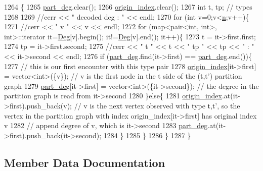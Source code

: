 \begin{DoxyCode}
1264 \{
1265   \hyperlink{classmarked__graph__decoder_a6882e96fcad9abb10e72f1398814824a}{part\_deg}.clear();
1266   \hyperlink{classmarked__graph__decoder_aab3e2f6d4376ba96da32f25aa9ddd069}{origin\_index}.clear();
1267   \textcolor{keywordtype}{int} t, tp; \textcolor{comment}{// types}
1268 
1269   \textcolor{comment}{//cerr << " decoded deg : " << endl;}
1270   \textcolor{keywordflow}{for} (\textcolor{keywordtype}{int} v=0;v<\hyperlink{classmarked__graph__decoder_aefc93611bc4a3e9a5d3956d97649a0e9}{n};v++)\{
1271     \textcolor{comment}{//cerr << " v " << v << endl;}
1272     \textcolor{keywordflow}{for} (map<pair<int, int>, \textcolor{keywordtype}{int}>::iterator it=\hyperlink{classmarked__graph__decoder_a5040ad86467693eab415f615408bfb9e}{Deg}[v].begin(); it!=\hyperlink{classmarked__graph__decoder_a5040ad86467693eab415f615408bfb9e}{Deg}[v].end(); it++)\{
1273       t = it->first.first;
1274       tp = it->first.second;
1275       \textcolor{comment}{//cerr << " t " << t << " tp " << tp << " : " << it->second << endl;}
1276       \textcolor{keywordflow}{if} (\hyperlink{classmarked__graph__decoder_a6882e96fcad9abb10e72f1398814824a}{part\_deg}.find(it->first) == \hyperlink{classmarked__graph__decoder_a6882e96fcad9abb10e72f1398814824a}{part\_deg}.end())\{
1277         \textcolor{comment}{// this is our first encounter with this type pair}
1278         \hyperlink{classmarked__graph__decoder_aab3e2f6d4376ba96da32f25aa9ddd069}{origin\_index}[it->first] = vector<int>(\{v\}); \textcolor{comment}{// v is the first node in the t side of the
       (t,t') partition graph}
1279         \hyperlink{classmarked__graph__decoder_a6882e96fcad9abb10e72f1398814824a}{part\_deg}[it->first] = vector<int>(\{it->second\}); \textcolor{comment}{// the degree in the partition graph is
       read from it->second}
1280       \}\textcolor{keywordflow}{else}\{
1281         \hyperlink{classmarked__graph__decoder_aab3e2f6d4376ba96da32f25aa9ddd069}{origin\_index}.at(it->first).push\_back(v); \textcolor{comment}{// v is the next vertex observed with type
       t,t', so the vertex in the partition graph with index origin\_index[it->first] has original index v }
1282         \textcolor{comment}{// append degree of v, which is it->second}
1283         \hyperlink{classmarked__graph__decoder_a6882e96fcad9abb10e72f1398814824a}{part\_deg}.at(it->first).push\_back(it->second);
1284       \}
1285     \}
1286   \}
1287 \}
\end{DoxyCode}


\subsection{Member Data Documentation}
\mbox{\label{classmarked__graph__decoder_a5040ad86467693eab415f615408bfb9e}} 

